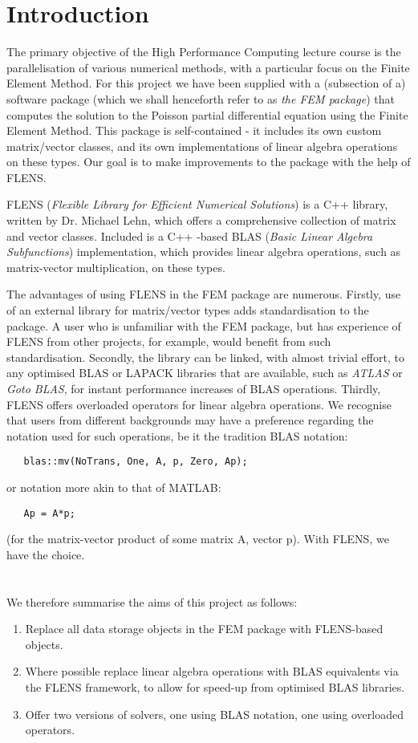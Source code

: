 \setcounter{section}{-1}
\section{Introduction}

The primary objective of the High Performance Computing lecture course is the parallelisation of various numerical methods, with a particular focus on the Finite Element Method. For this project we have been supplied with a (subsection of a) software package (which we shall henceforth refer to as \emph{the FEM package}) that computes the solution to the Poisson partial differential equation using the Finite Element Method. This package is self-contained - it includes its own custom matrix/vector classes, and its own implementations of linear algebra operations on these types. Our goal is to make improvements to the package with the help of FLENS.

FLENS (\emph{Flexible Library for Efficient Numerical Solutions}) is a C++ library, written by Dr. Michael Lehn, which offers a comprehensive collection of matrix and vector classes. Included is a C++ -based BLAS (\emph{Basic Linear Algebra Subfunctions}) implementation, which provides linear algebra operations, such as matrix-vector multiplication, on these types. 

The advantages of using FLENS in the FEM package are numerous. Firstly, use of an external library for matrix/vector types adds standardisation to the package. A user who is unfamiliar with the FEM package, but has experience of FLENS from other projects, for example, would benefit from such standardisation. Secondly, the library can be linked, with almost trivial effort, to any optimised BLAS or LAPACK libraries that are available, such as \emph{ATLAS} or \emph{Goto BLAS}, for instant performance increases of BLAS operations. Thirdly, FLENS offers overloaded operators for linear algebra operations. We recognise that users from different backgrounds may have a preference regarding the notation used for such operations, be it the tradition BLAS notation:
\begin{lstlisting}
   blas::mv(NoTrans, One, A, p, Zero, Ap);
\end{lstlisting}
or notation more akin to that of MATLAB:
\begin{lstlisting}
   Ap = A*p;
\end{lstlisting}
(for the matrix-vector product of some matrix A, vector p). With FLENS, we have the choice.
\\\\\\
We therefore summarise the aims of this project as follows:
\begin{enumerate}
   \item Replace all data storage objects in the FEM package with FLENS-based objects.
   \item Where possible replace linear algebra operations with BLAS equivalents via the FLENS framework, to allow for speed-up from optimised BLAS libraries.
   \item Offer two versions of solvers, one using BLAS notation, one using overloaded operators.
\end{enumerate}



